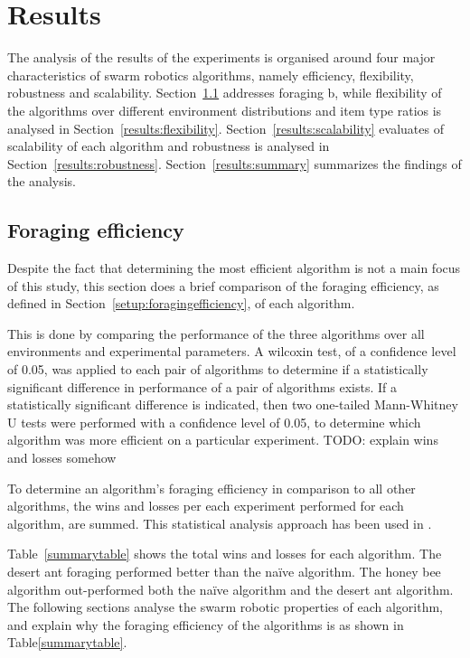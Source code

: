 \chapter{Results}
\label{chap:results}

The analysis of the results of the experiments is organised around four major characteristics of swarm robotics algorithms, namely efficiency, flexibility, robustness and scalability. Section~\ref{results:efficiency} addresses foraging b, while flexibility of the algorithms over different environment distributions and item type ratios is analysed in Section~\ref{results:flexibility}. Section~\ref{results:scalability} evaluates of scalability of each algorithm and robustness is analysed in Section~\ref{results:robustness}. Section~\ref{results:summary} summarizes the findings of the analysis.

\section{Foraging efficiency}
\label{results:efficiency}


Despite the fact that determining the most efficient algorithm is not a main focus of this study, this section does a brief comparison of the foraging efficiency, as defined in Section~\ref{setup:foragingefficiency}, of each algorithm. 

This is done by comparing the performance of the three algorithms over all environments and experimental parameters. A wilcoxin test, of a confidence level of 0.05, was applied to each pair of algorithms to determine if a statistically significant difference in performance of a pair of algorithms exists. If a statistically significant difference is indicated, then two one-tailed Mann-Whitney U tests were performed with a confidence level of 0.05, to determine which algorithm was more efficient on a particular experiment. TODO: explain wins and losses somehow

To determine an algorithm's foraging efficiency in comparison to all other algorithms, the wins and losses per each experiment performed for each algorithm, are summed. This statistical analysis approach has been used in \cite{helbig2013performance}.

Table~\ref{summarytable} shows the total wins and losses for each algorithm. The desert ant foraging performed better than the na\"ive algorithm. The honey bee algorithm out-performed both the na\"ive algorithm and the desert ant algorithm. The following sections analyse the swarm robotic properties of each algorithm, and explain why the foraging efficiency of the algorithms is as shown in Table\ref{summarytable}.


